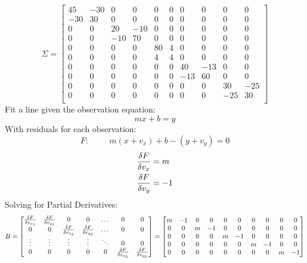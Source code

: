 \[
\Sigma = 
 \begin{bmatrix}
 45&-30&0&0&0&0&0&0&0&0\\
 -30&30&0&0&0&0&0&0&0&0\\
 0&0&20&-10&0&0&0&0&0&0\\
 0&0&-10&70&0&0&0&0&0&0\\
 0&0&0&0&80&4&0&0&0&0\\
 0&0&0&0&4&4&0&0&0&0\\
 0&0&0&0&0&0&40&-13&0&0\\
 0&0&0&0&0&0&-13&60&0&0\\
 0&0&0&0&0&0&0&0&30&-25\\
 0&0&0&0&0&0&0&0&-25&30\\
 \end{bmatrix}
\]
Fit a line given the observation equation:
\[
mx + b = y 
\]
With residuals for each observation:
\[
F: \hspace{1cm} m(x+v_x) + b - (y+v_y) = 0 
\]
\begin{align*}
\frac{\delta F}{\delta v_x} &= m \\
\frac{\delta F}{\delta v_y} &= -1\\
\end{align*}
Solving for Partial Derivatives:
\[
B = 
\begin{bmatrix}
\frac{\delta F}{\delta v_{x_1}} & \frac{\delta F}{\delta v_{y_1}} & 0 & 0 & \dots & 0 & 0 \\
0 & 0 & \frac{\delta F}{\delta v_{x_2}} & \frac{\delta F}{\delta v_{y_2}} &  \dots  & 0 & 0 \\
\vdots & \vdots & \vdots & \vdots & \ddots & 0 & 0 \\
0 & 0 & 0 & 0 & 0 & \frac{\delta F}{\delta v_{x_5}} & \frac{\delta F}{\delta v_{y_5}} \\
\end{bmatrix}
=
\begin{bmatrix}
m & -1 & 0 & 0 & 0 & 0 & 0 & 0 & 0 & 0 \\
0 & 0 & m & -1 & 0 & 0 & 0 & 0 & 0 & 0 \\
0 & 0 & 0 & 0 & m & -1 & 0 & 0 & 0 & 0 \\
0 & 0 & 0 & 0 & 0 & 0 & m & -1 & 0 & 0 \\
0 & 0 & 0 & 0 & 0 & 0 & 0 & 0 & m & -1 \\
\end{bmatrix}
\]
